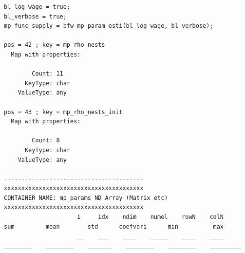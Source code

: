 \documentclass[
]{book}
\begin{document}
\begin{verbatim}
bl_log_wage = true;
bl_verbose = true;
mp_func_supply = bfw_mp_param_esti(bl_log_wage, bl_verbose);

pos = 42 ; key = mp_rho_nests
  Map with properties:

        Count: 11
      KeyType: char
    ValueType: any

pos = 43 ; key = mp_rho_nests_init
  Map with properties:

        Count: 8
      KeyType: char
    ValueType: any

----------------------------------------
xxxxxxxxxxxxxxxxxxxxxxxxxxxxxxxxxxxxxxxx
CONTAINER NAME: mp_params ND Array (Matrix etc)
xxxxxxxxxxxxxxxxxxxxxxxxxxxxxxxxxxxxxxxx
                     i     idx    ndim    numel    rowN    colN      sum         mean        std      coefvari      min          max   
                     __    ___    ____    _____    ____    ____    ________    ________    _______    ________    ________    _________


\end{verbatim}
\end{document}
